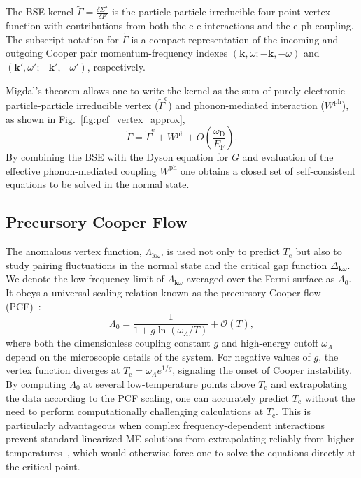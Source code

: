 \documentclass[%
 reprint,
superscriptaddress,
 amsmath,amssymb,
 aps,
prx,
]{revtex4-2}
\newcommand{\change}[2]{{\sout{#1} {\color{orange} {#2}}}}
\newcommand{\bk}{\mathbf{k}}
\newcommand{\Gammapp}{\tilde{\Gamma}}
\newcommand{\txa}{\text{a}}
\newcommand{\txc}{\text{c}}
\newcommand{\txe}{\text{e}}
\newcommand{\txD}{\text{D}}
\newcommand{\txF}{\text{F}}
\newcommand{\txph}{\text{ph}}
\begin{document}
The BSE kernel $\Gammapp=\frac{\delta \Sigma^\txa}{\delta F}$  is  the particle-particle irreducible four-point vertex function  with contributions from both the e-e interactions and the e-ph coupling. The subscript notation for $\Gammapp$ is a compact representation of the incoming and outgoing Cooper pair momentum-frequency indexes $(\bk,\omega; -\bk,-\omega)$ and $(\bk',\omega'; -\bk',-\omega')$, respectively. 


Migdal’s theorem allows one to write the kernel as the sum of purely electronic particle-particle irreducible vertex ($\Gammapp^\txe$) and phonon-mediated interaction ($W^{\txph}$), as shown in Fig.~\ref{fig:pcf_vertex_approx},
\begin{equation}
\Gammapp = \Gammapp^\txe+W^{\txph}+O\left(\frac{\omega_\txD}{E_\txF}\right).
\label{eq:gammapp_approx}
\end{equation}
By combining the BSE with the Dyson equation for $G$ and evaluation of the effective phonon-mediated coupling $W^{\txph}$ one obtains a
closed set of self-consistent equations to be solved in the normal state.

\subsection{Precursory Cooper Flow}  
The anomalous vertex function, $\Lambda_{\bk\omega}$, is used
not only to predict $T_\txc$ but also to study pairing fluctuations in the normal state and the critical gap function $\Delta_{\bk\omega}$.
We denote the low-frequency limit of $\Lambda_{\bk\omega}$ averaged over the Fermi surface as $\Lambda_0$. It obeys a universal scaling relation known as the precursory Cooper flow
(PCF)~\cite{pengcheng}:
\begin{equation}
\label{eq:PCF_scaling}
\Lambda_0  = \frac{1}{1 + g \ln(\omega_\Lambda/T)} + \mathcal{O}(T),
\end{equation}
where both the dimensionless coupling constant $g$ and high-energy cutoff $\omega_\Lambda$ depend on the microscopic details of the system. For negative values of $g$, the vertex function diverges at $T_\txc = \omega_\Lambda e^{1/g}$, signaling the onset of Cooper instability. By computing $\Lambda_0$ at several low-temperature points above $T_\txc$ and extrapolating the data according to the PCF scaling, one can accurately predict $T_\txc$
{without the need to perform computationally challenging calculations at $T_\txc$. This is particularly advantageous when complex frequency-dependent interactions prevent standard linearized ME solutions from extrapolating reliably from higher temperatures~\cite{implicit,pengcheng}, which would otherwise force one to solve the equations directly at the critical point.}
\end{document}
